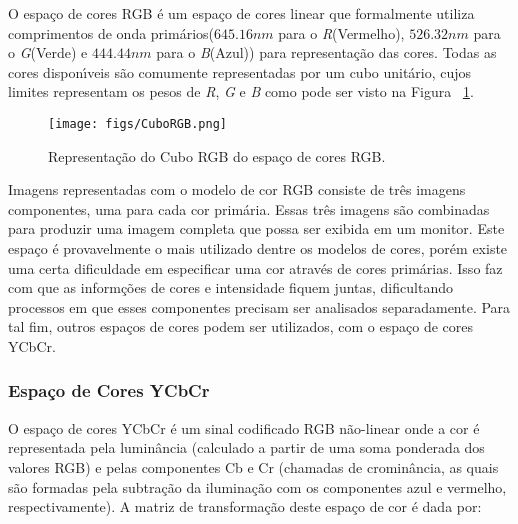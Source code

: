 O espa\c{c}o de cores \ac{RGB} \'{e} um espa\c{c}o de cores linear que formalmente utiliza comprimentos de onda prim\'{a}rios($645.16 nm$ para o 
\emph{R}(Vermelho), $526.32 nm$ para o \emph{G}(Verde) e $444.44 nm$ para o \emph{B}(Azul)) para representa\c{c}\~{a}o das cores. Todas as 
cores dispon\'{\i}veis s\~{a}o comumente representadas por um cubo unit\'{a}rio, cujos limites representam os pesos de \emph{R}, \emph{G} e 
\emph{B} como pode ser visto na Figura ~\ref{FIG:CUBORGB}\cite{FORSYTH:2003}.

\begin{figure}[h]
\centering
\texttt{[image: figs/CuboRGB.png]}
\caption{Representa\c{c}\~{a}o do Cubo RGB do espa\c{c}o de cores RGB.} \label{FIG:CUBORGB}
\end{figure}

Imagens representadas com o modelo de cor \ac{RGB} consiste de tr\^{e}s imagens componentes, uma para cada cor prim\'{a}ria. Essas tr\^{e}s 
imagens s\~{a}o combinadas para produzir uma imagem completa que possa ser exibida em um monitor\cite{GONZALEZ:2008}. Este espa\c{c}o \'{e} 
provavelmente o mais utilizado dentre os modelos de cores, por\'{e}m existe uma certa dificuldade em especificar uma cor atrav\'{e}s de 
cores prim\'{a}rias. Isso faz com que as inform\c{c}\~{o}es de cores e intensidade fiquem juntas, dificultando processos em que esses 
componentes precisam ser analisados separadamente\cite{BARROS:2010}. Para tal fim, outros espa\c{c}os de cores podem ser utilizados, 
com o espa\c{c}o de cores \ac{YCbCr}.

\subsubsection{Espa\c{c}o de Cores YCbCr}

O espa\c{c}o de cores \ac{YCbCr} \'{e} um sinal codificado \ac{RGB} n\~{a}o-linear onde a cor \'{e} representada pela lumin\^{a}ncia (calculado a 
partir de uma soma ponderada dos valores RGB) e pelas componentes Cb e Cr (chamadas de cromin\^{a}ncia, as quais s\~{a}o formadas pela 
subtra\c{c}\~{a}o da ilumina\c{c}\~{a}o com os componentes azul e vermelho, respectivamente)\cite{GONZALEZ:2008}. A matriz de transforma\c{c}\~{a}o deste 
espa\c{c}o de cor \'{e} dada por:

